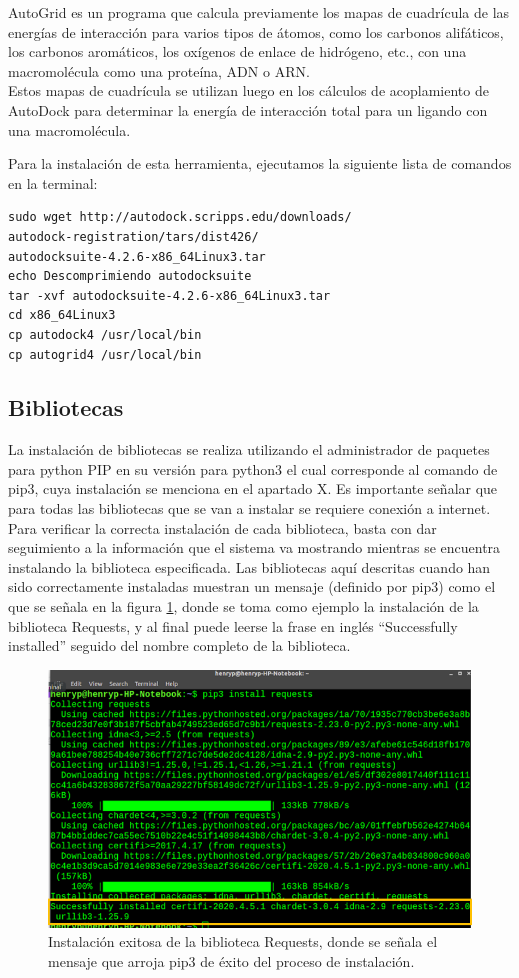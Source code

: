 {\noindent AutoGrid es un programa que calcula previamente los mapas de cuadrícula de las energías de interacción para varios tipos de átomos, como los carbonos alifáticos, los carbonos aromáticos, los oxígenos de enlace de hidrógeno, etc., con una macromolécula como una proteína, ADN o ARN.\\

\noindent Estos mapas de cuadrícula se utilizan luego en los cálculos de acoplamiento de AutoDock para determinar la energía de interacción total para un ligando con una macromolécula.

\noindent Para la instalación de esta herramienta, ejecutamos la siguiente lista de comandos en la terminal:
\begin{lstlisting}
sudo wget http://autodock.scripps.edu/downloads/
autodock-registration/tars/dist426/
autodocksuite-4.2.6-x86_64Linux3.tar
echo Descomprimiendo autodocksuite
tar -xvf autodocksuite-4.2.6-x86_64Linux3.tar
cd x86_64Linux3
cp autodock4 /usr/local/bin
cp autogrid4 /usr/local/bin
\end{lstlisting}
\subsection{Bibliotecas}{
\noindent La instalación de bibliotecas se realiza utilizando el administrador de paquetes para python PIP en su versión para python3 el cual corresponde al comando de pip3, cuya instalación se menciona en el apartado X. Es importante señalar que para todas las bibliotecas que se van a instalar se requiere conexión a internet. Para verificar la correcta instalación de cada biblioteca, basta con dar seguimiento a la información que el sistema va mostrando mientras se encuentra instalando la biblioteca especificada. Las bibliotecas aquí descritas cuando han sido correctamente instaladas muestran un mensaje (definido por pip3) como el que se señala en la figura \ref{3.1}, donde se toma como ejemplo la instalación de la biblioteca Requests, y al final puede leerse la frase en inglés “Successfully installed” seguido del nombre completo de la biblioteca.

\begin{figure}[H]
    \centering
    \includegraphics[scale=0.85]{Capitulo4/Documentos/imagenes_entorno/figura3-1.png}
    \caption{Instalación exitosa de la biblioteca Requests, donde se señala el mensaje que arroja pip3 de éxito del proceso de instalación.}
    \label{3.1}
\end{figure}
}}
